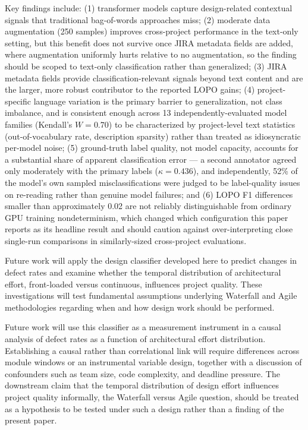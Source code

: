 \documentclass[preprint,12pt]{elsarticle}
\begin{document}
Key findings include: (1) transformer models capture design-related contextual signals that traditional bag-of-words approaches miss; (2) moderate data augmentation (250 samples) improves cross-project performance in the text-only setting, but this benefit does not survive once JIRA metadata fields are added, where augmentation uniformly hurts relative to no augmentation, so the finding should be scoped to text-only classification rather than generalized; (3) JIRA metadata fields provide classification-relevant signals beyond text content and are the larger, more robust contributor to the reported LOPO gains; (4) project-specific language variation is the primary barrier to generalization, not class imbalance, and is consistent enough across 13 independently-evaluated model families (Kendall's $W=0.70$) to be characterized by project-level text statistics (out-of-vocabulary rate, description sparsity) rather than treated as idiosyncratic per-model noise; (5) ground-truth label quality, not model capacity, accounts for a substantial share of apparent classification error — a second annotator agreed only moderately with the primary labels ($\kappa=0.436$), and independently, 52\% of the model's own sampled misclassifications were judged to be label-quality issues on re-reading rather than genuine model failures; and (6) LOPO F1 differences smaller than approximately 0.02 are not reliably distinguishable from ordinary GPU training nondeterminism, which changed which configuration this paper reports as its headline result and should caution against over-interpreting close single-run comparisons in similarly-sized cross-project evaluations.

Future work will apply the design classifier developed here to predict changes in defect rates and examine whether the temporal distribution of architectural effort, front-loaded versus continuous, influences project quality. These investigations will test fundamental assumptions underlying Waterfall and Agile methodologies regarding when and how design work should be performed.

Future work will use this classifier as a measurement instrument in a causal analysis of defect rates as a function of architectural effort distribution. Establishing a causal rather than correlational link will require differences across module windows or an instrumental variable design, together with a discussion of confounders such as team size, code complexity, and deadline pressure. The downstream claim that the temporal distribution of design effort influences project quality informally, the Waterfall versus Agile question, should be treated as a hypothesis to be tested under such a design rather than a finding of the present paper.
\end{document}
